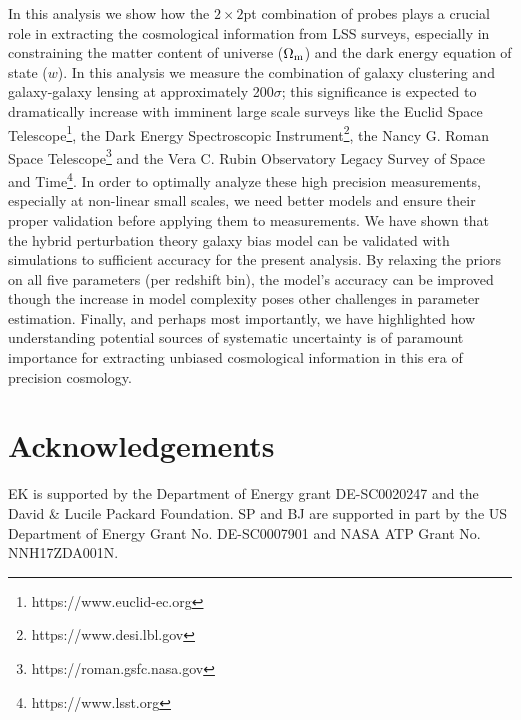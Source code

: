 \documentclass[aps, prd,twocolumn,superscriptaddress,nofootinbib,preprintnumbers]{revtex4-1}
\begin{document}

In this analysis we show how the $2\times2$pt combination of probes plays a crucial role in extracting the cosmological information from LSS surveys, especially in constraining the matter content of universe ($\Omega_{\rm m}$) and the dark energy equation of state ($w$). In this analysis we measure the combination of galaxy clustering and galaxy-galaxy lensing  at approximately 200$\sigma$; this significance  is expected to dramatically increase with imminent large scale surveys like the Euclid Space Telescope\footnote{https://www.euclid-ec.org}, the Dark Energy Spectroscopic Instrument\footnote{https://www.desi.lbl.gov}, the Nancy G. Roman Space Telescope\footnote{https://roman.gsfc.nasa.gov} and the Vera C. Rubin Observatory Legacy Survey of Space and Time\footnote{https://www.lsst.org}. In order to optimally analyze these high precision measurements, especially at non-linear small scales, we need better models and ensure their proper validation before applying them to measurements. We have shown that the  hybrid perturbation theory galaxy bias model can be validated with simulations to sufficient accuracy for the present analysis. By relaxing the priors on all five parameters (per redshift bin), the model's accuracy can be improved though the increase in model complexity poses other challenges in parameter estimation. Finally, and perhaps most importantly, we have highlighted how understanding   potential sources of systematic uncertainty is of paramount importance for extracting  unbiased cosmological information in this era of precision cosmology. 


\section*{Acknowledgements}
EK is supported by the Department of Energy grant DE-SC0020247 and the David \& Lucile Packard Foundation.
SP and BJ are supported in part by the US Department of Energy Grant No. DE-SC0007901 and NASA ATP Grant No. NNH17ZDA001N. 







\end{document}
